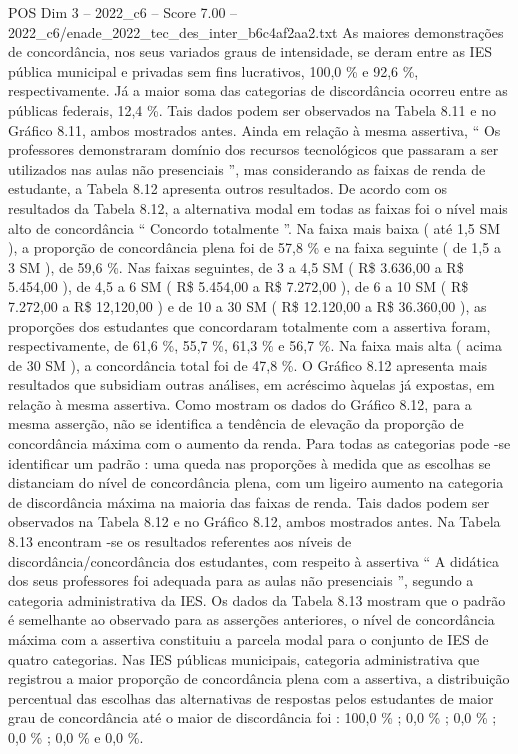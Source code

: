 \begin{textsample}{POS Dim 3 – 2022\_c6 – Score 7.00 – 2022\_c6/enade\_2022\_tec\_des\_inter\_b6c4af2aa2.txt}
As maiores demonstrações de concordância, nos seus variados graus de intensidade, se deram entre as IES pública municipal e privadas sem fins lucrativos, 100,0 \% e 92,6 \%, respectivamente.
Já a maior soma das categorias de discordância ocorreu entre as públicas federais, 12,4 \%.
Tais dados podem ser observados na Tabela 8.11 e no Gráfico 8.11, ambos mostrados antes.
Ainda em relação à mesma assertiva, “ Os professores demonstraram domínio dos recursos tecnológicos que passaram a ser utilizados nas aulas não presenciais ”, mas considerando as faixas de renda de estudante, a Tabela 8.12 apresenta outros resultados.
De acordo com os resultados da Tabela 8.12, a alternativa modal em todas as faixas foi o nível mais alto de concordância “ Concordo totalmente ”.
Na faixa mais baixa ( até 1,5 SM ), a proporção de concordância plena foi de 57,8 \% e na faixa seguinte ( de 1,5 a 3 SM ), de 59,6 \%.
Nas faixas seguintes, de 3 a 4,5 SM ( R\$ 3.636,00 a R\$ 5.454,00 ), de 4,5 a 6 SM ( R\$ 5.454,00 a R\$ 7.272,00 ), de 6 a 10 SM ( R\$ 7.272,00 a R\$ 12,120,00 ) e de 10 a 30 SM ( R\$ 12.120,00 a R\$ 36.360,00 ), as proporções dos estudantes que concordaram totalmente com a assertiva foram, respectivamente, de 61,6 \%, 55,7 \%, 61,3 \% e 56,7 \%.
Na faixa mais alta ( acima de 30 SM ), a concordância total foi de 47,8 \%.
O Gráfico 8.12 apresenta mais resultados que subsidiam outras análises, em acréscimo àquelas já expostas, em relação à mesma assertiva.
Como mostram os dados do Gráfico 8.12, para a mesma asserção, não se identifica a tendência de elevação da proporção de concordância máxima com o aumento da renda.
Para todas as categorias pode -se identificar um padrão : uma queda nas proporções à medida que as escolhas se distanciam do nível de concordância plena, com um ligeiro aumento na categoria de discordância máxima na maioria das faixas de renda.
Tais dados podem ser observados na Tabela 8.12 e no Gráfico 8.12, ambos mostrados antes.
Na Tabela 8.13 encontram -se os resultados referentes aos níveis de discordância/concordância dos estudantes, com respeito à assertiva “ A didática dos seus professores foi adequada para as aulas não presenciais ”, segundo a categoria administrativa da IES.
Os dados da Tabela 8.13 mostram que o padrão é semelhante ao observado para as asserções anteriores, o nível de concordância máxima com a assertiva constituiu a parcela modal para o conjunto de IES de quatro categorias.
Nas IES públicas municipais, categoria administrativa que registrou a maior proporção de concordância plena com a assertiva, a distribuição percentual das escolhas das alternativas de respostas pelos estudantes de maior grau de concordância até o maior de discordância foi : 100,0 \% ; 0,0 \% ; 0,0 \% ; 0,0 \% ; 0,0 \% e 0,0 \%.

\end{textsample}
